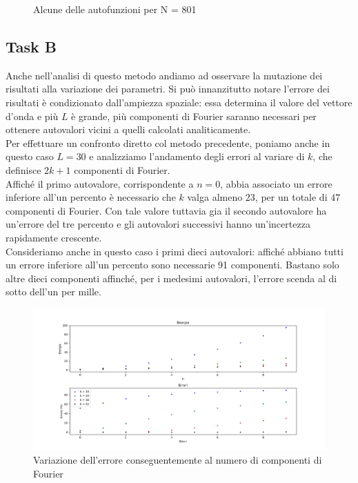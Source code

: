 \documentclass[a4paper,11pt]{article}
\begin{document}
\begin{figure}[h!]
{\begin{minipage}{18cm}
\end{minipage}
}
\caption{Alcune delle autofunzioni per N = 801}
\end{figure}


\subsection*{Task B}

Anche nell'analisi di questo metodo andiamo ad osservare la mutazione dei risultati alla variazione dei parametri. Si può innanzitutto notare l'errore dei risultati è condizionato dall'ampiezza spaziale: essa determina il valore del vettore d'onda e più $L$ è grande, più componenti di Fourier saranno necessari per ottenere autovalori vicini a quelli calcolati analiticamente. \\
Per effettuare un confronto diretto col metodo precedente, poniamo anche in questo caso $L=30$ e analizziamo l'andamento degli errori al variare di $k$, che definisce $2k+1$ componenti di Fourier. \\
Affiché il primo autovalore, corrispondente a $n=0$, abbia associato un errore inferiore all'un percento è necessario che $k$ valga almeno $23$, per un totale di $47$ componenti di Fourier. Con tale valore tuttavia gia il secondo autovalore ha un'errore del tre percento e gli autovalori successivi hanno un'incertezza rapidamente crescente. \\
Consideriamo anche in questo caso i primi dieci autovalori: affiché abbiano tutti un errore inferiore all'un percento sono necessarie 91 componenti. Bastano solo altre dieci componenti affinché, per i medesimi autovalori, l'errore scenda al di sotto dell'un per mille.\\


\begin{figure}[h!]
\includegraphics[width=\textwidth]{Differenze_B.png}
\caption{Variazione dell'errore conseguentemente al numero di componenti di Fourier}
\end{figure}
\end{document}
